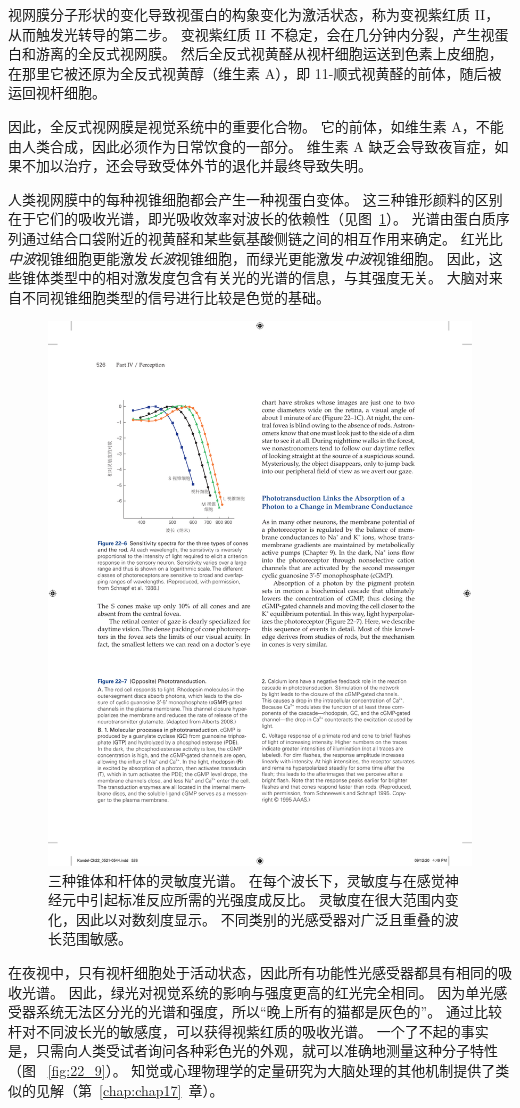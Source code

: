 视网膜分子形状的变化导致视蛋白的构象变化为激活状态，称为变视紫红质 II，从而触发光转导的第二步。
变视紫红质 II 不稳定，会在几分钟内分裂，产生视蛋白和游离的全反式视网膜。
然后全反式视黄醛从视杆细胞运送到色素上皮细胞，在那里它被还原为全反式视黄醇（维生素 A），即 11-顺式视黄醛的前体，随后被运回视杆细胞。


因此，全反式视网膜是视觉系统中的重要化合物。
它的前体，如维生素 A，不能由人类合成，因此必须作为日常饮食的一部分。
维生素 A 缺乏会导致夜盲症，如果不加以治疗，还会导致受体外节的退化并最终导致失明。


人类视网膜中的每种视锥细胞都会产生一种视蛋白变体。 
这三种锥形颜料的区别在于它们的吸收光谱，即光吸收效率对波长的依赖性（见图~\ref{fig:22_6}）。
光谱由蛋白质序列通过结合口袋附近的视黄醛和某些氨基酸侧链之间的相互作用来确定。
红光比\textit{中波}视锥细胞更能激发\textit{长波}视锥细胞，而绿光更能激发\textit{中波}视锥细胞。
因此，这些锥体类型中的相对激发度包含有关光的光谱的信息，与其强度无关。
大脑对来自不同视锥细胞类型的信号进行比较是色觉的基础。


\begin{figure}[htbp]
	\centering
	\includegraphics[width=0.55\linewidth]{chap22/fig_22_6}
	\caption{三种锥体和杆体的灵敏度光谱。 
		在每个波长下，灵敏度与在感觉神经元中引起标准反应所需的光强度成反比。 
		灵敏度在很大范围内变化，因此以对数刻度显示。 
		不同类别的光感受器对广泛且重叠的波长范围敏感。}
	\label{fig:22_6}
\end{figure}


在夜视中，只有视杆细胞处于活动状态，因此所有功能性光感受器都具有相同的吸收光谱。
因此，绿光对视觉系统的影响与强度更高的红光完全相同。
因为单光感受器系统无法区分光的光谱和强度，所以“晚上所有的猫都是灰色的”。
通过比较杆对不同波长光的敏感度，可以获得视紫红质的吸收光谱。
一个了不起的事实是，只需向人类受试者询问各种彩色光的外观，就可以准确地测量这种分子特性（图 ~\ref{fig:22_9}）。
知觉或心理物理学的定量研究为大脑处理的其他机制提供了类似的见解（第~\ref{chap:chap17}~章）。



